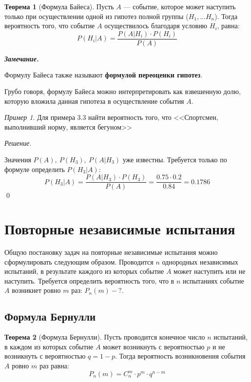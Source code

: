 \documentclass[12pt,a4paper]{article}
\theoremstyle{definition}
\theoremstyle{definition}
\newtheorem{theorem}{Теорема}[section]
\theoremstyle{remark}
\newenvironment{remark}{
  \par\noindent\textbf{\textit{Замечание.}}~
}{\par}
\theoremstyle{corollary}
\theoremstyle{bolditalic}
\newtheorem{example}{Пример}[section]
\newenvironment{solution}{
    \vspace{0.5em}
    \noindent\textit{Решение.}
}{\qed\vspace{1em}}
\begin{document}
\begin{theorem}[Формула Байеса]
    Пусть $A$ --- событие, которое может наступить только при осуществлении одной из гипотез полной группы ($H_1, ... H_n$). Тогда вероятность того, что событие $A$ осуществилось благодаря условию $H_i$, равна:
    \[
    P(H_i|A)=\frac{P(A|H_i)\cdot P(H_i)}{P(A)}
    \]
\end{theorem}

\begin{remark}
    Формулу Байеса также называют \textbf{формулой переоценки гипотез}.
\end{remark}
\vspace{1em}
Грубо говоря, формулу Байеса можно интерпретировать как взвешенную долю, которую вложила данная гипотеза в осуществление события $A$.

\begin{example}
    Для примера 3.3 найти вероятность того, что <<Спортсмен, выполнивший норму, является бегуном>>
\end{example}

\begin{solution}
    Значения $P(A), \ P(H_3), \ P(A|H_3)$ уже известны. Требуется только по формуле определить $P(H_3|A)$:
    \[
    P(H_3|A)=\frac{P(A|H_3)\cdot P(H_3)}{P(A)}=\frac{0.75\cdot 0.2}{0.84}=0.1786
    \]
\end{solution}

\newpage

\section{Повторные независимые испытания}

Общую постановку задач на повторные независимые испытания можно сформулировать следующим образом. Проводится $n$ однородных независимых испытаний, в результате каждого из которых событие $A$ может наступить или не наступить. Требуется определить вероятность того, что в $n$ испытаниях событие $A$ возникнет ровно $m$ раз: $P_n(m) - ?$.

\subsection{Формула Бернулли}

\begin{theorem}[Формула Бернулли]
    Пусть проводится конечное число $n$ испытаний, в каждом из которых событие $A$ может возникнуть с вероятностью $p$ и не возникнуть с вероятностью $q=1-p$. Тогда вероятность возникновения события $A$ ровно $m$ раз равна:
    \[
    P_n(m)=C_n^m\cdot p^m\cdot q^{n-m}
    \]
\end{theorem}
\end{document}
